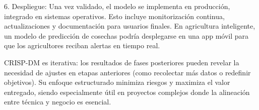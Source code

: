 6. Despliegue: Una vez validado, el modelo se implementa en producción, integrado en sistemas operativos. Esto incluye monitorización continua, actualizaciones y documentación para usuarios finales. En agricultura inteligente, un modelo de predicción de cosechas podría desplegarse en una app móvil para que los agricultores reciban alertas en tiempo real.  

CRISP-DM es iterativa: los resultados de fases posteriores pueden revelar la necesidad de ajustes en etapas anteriores (como recolectar más datos o redefinir objetivos). Su enfoque estructurado minimiza riesgos y maximiza el valor entregado, siendo especialmente útil en proyectos complejos donde la alineación entre técnica y negocio es esencial.